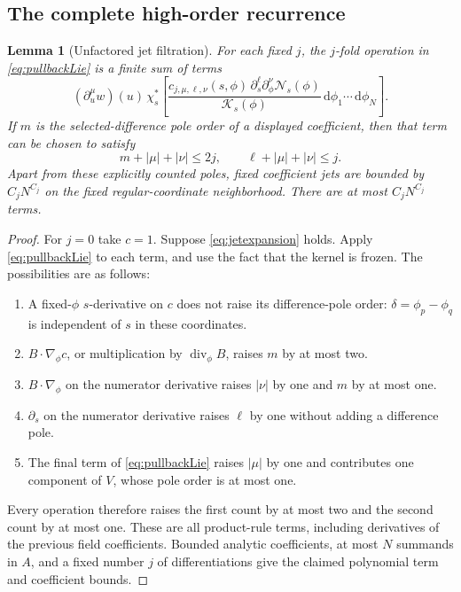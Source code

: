\documentclass[11pt]{article}
\numberwithin{equation}{section}
\newtheorem{lemma}[theorem]{Lemma}
\theoremstyle{definition}
\newcommand{\dd}{\,\mathrm d}
\begin{document}
\subsection{The complete high-order recurrence}
\begin{lemma}[Unfactored jet filtration]\label{lem:jets}
For each fixed \(j\), the \(j\)-fold operation in
\eqref{eq:pullbackLie} is a finite sum of terms
\begin{equation}
 (\partial_u^\mu w)(u)\,
 \chi_s^*\left[
  \frac{c_{j,\mu,\ell,\nu}(s,\phi)\,
        \partial_s^\ell\partial_\phi^\nu\mathscr N_s(\phi)}
       {\mathcal K_s(\phi)}
       \dd\phi_1\cdots\dd\phi_N\right].
 \label{eq:jetexpansion}
\end{equation}
If \(m\) is the selected-difference pole order of a displayed
coefficient, then that term can be chosen to satisfy
\begin{equation}
 m+|\mu|+|\nu|\le2j,\qquad
 \ell+|\mu|+|\nu|\le j .
 \label{eq:jetdegree}
\end{equation}
Apart from these explicitly counted poles, fixed coefficient jets
are bounded by \(C_jN^{C_j}\) on the fixed regular-coordinate
neighborhood. There are at most \(C_jN^{C_j}\) terms.
\end{lemma}
\begin{proof}
For \(j=0\) take \(c=1\). Suppose \eqref{eq:jetexpansion} holds.
Apply \eqref{eq:pullbackLie} to each term, and use the fact that
the kernel is frozen. The possibilities are as follows:
\begin{enumerate}
\item A fixed-\(\phi\) \(s\)-derivative on \(c\) does not raise its
difference-pole order: \(\delta=\phi_p-\phi_q\) is independent of
\(s\) in these coordinates.
\item \(B\cdot\nabla_\phi c\), or multiplication by
\(\operatorname{div}_\phi B\), raises \(m\) by at most two.
\item \(B\cdot\nabla_\phi\) on the numerator derivative raises
\(|\nu|\) by one and \(m\) by at most one.
\item \(\partial_s\) on the numerator derivative raises \(\ell\)
by one without adding a difference pole.
\item The final term of \eqref{eq:pullbackLie} raises \(|\mu|\)
by one and contributes one component of \(V\), whose pole
order is at most one.
\end{enumerate}
Every operation therefore raises the first count by at most two
and the second count by at most one. These are all product-rule
terms, including derivatives of the previous field coefficients.
Bounded analytic coefficients, at most \(N\) summands in \(A\),
and a fixed number \(j\) of differentiations give the claimed
polynomial term and coefficient bounds.
\end{proof}
\end{document}
